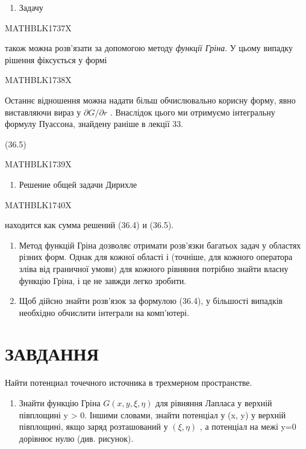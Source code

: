 \documentclass[
  ukrainian,
]{article}
\providecommand{\tightlist}{%
  \setlength{\itemsep}{0pt}\setlength{\parskip}{0pt}}
\begin{document}
\begin{enumerate}
\def\labelenumi{\arabic{enumi}.}
\tightlist
\item
  Задачу
\end{enumerate}

MATHBLK1737X

також можна розв'язати за допомогою методу \emph{функції Гріна}. У цьому
випадку рішення фіксується у формі

MATHBLK1738X

Останнє відношення можна надати більш обчислювально корисну форму, явно
виставляючи вираз у \(\partial G/\partial r\) . Внаслідок цього ми
отримуємо інтегральну формулу Пуассона, знайдену раніше в лекції 33.

(36.5)

MATHBLK1739X

\begin{enumerate}
\def\labelenumi{\arabic{enumi}.}
\setcounter{enumi}{1}
\tightlist
\item
  Решение общей задачи Дирихле
\end{enumerate}

MATHBLK1740X

находится как сумма решений (36.4) и (36.5).

\begin{enumerate}
\def\labelenumi{\arabic{enumi}.}
\setcounter{enumi}{2}
\item
  Метод функцій Гріна дозволяє отримати розв'язки багатьох задач у
  областях різних форм. Однак для кожної області і (точніше, для кожного
  оператора зліва від граничної умови) для кожного рівняння потрібно
  знайти власну функцію Гріна, і це не завжди легко зробити.
\item
  Щоб дійсно знайти розв'язок за формулою (36.4), у більшості випадків
  необхідно обчислити інтеграли на комп'ютері.
\end{enumerate}

\section{ЗАВДАННЯ}\label{ux437ux430ux432ux434ux430ux43dux43dux44f}

Найти потенциал точечного источника в трехмерном пространстве.

\begin{enumerate}
\def\labelenumi{\arabic{enumi}.}
\setcounter{enumi}{1}
\tightlist
\item
  Знайти функцію Гріна \(G(x, y, \xi, \eta)\) для рівняння Лапласа у
  верхній півплощині y \textgreater{} 0. Іншими словами, знайти
  потенціал у (x, y) у верхній півплощині, якщо заряд розташований у
  \((\xi, \eta)\) , а потенціал на межі y=0 дорівнює нулю (див.
  рисунок).
\end{enumerate}
\end{document}
